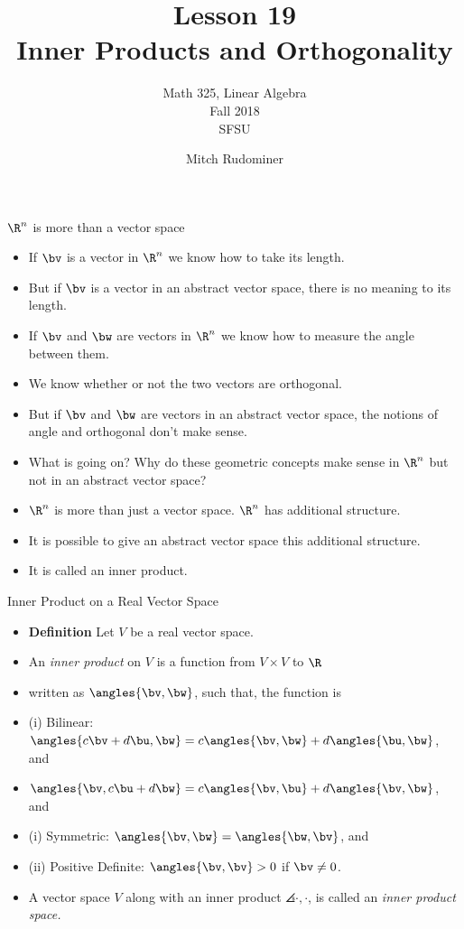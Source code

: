 \documentclass{beamer}
\title{Lesson 19 \\ Inner Products and Orthogonality}
\subtitle{Math 325, Linear Algebra \\ Fall 2018 \\ SFSU}
\author{Mitch Rudominer}
\date{}
\begin{document}
\begin{frame}
  \titlepage
\end{frame}


\begin{frame}{$\R^n$ is more than a vector space}

\begin{itemize}
\item If $\bv$ is a vector in $\R^n$ we know how to take its length.
\item But if $\bv$ is a vector in an abstract vector space, there is no meaning to its length.
\item If $\bv$ and $\bw$ are vectors in $\R^n$ we know how to measure the angle between them.
\item We know whether or not the two vectors are orthogonal.
\item But if $\bv$ and $\bw$ are vectors in an abstract vector space, the notions of angle and orthogonal don't make sense.
\item What is going on? Why do these geometric concepts make sense in $\R^n$ but not in an abstract vector space?
\item $\R^n$ is more than just a vector space. $\R^n$ has additional structure.
\item It is possible to give an abstract vector space this additional structure.
\item It is called an inner product.
\end{itemize}
\end{frame}


\begin{frame}{Inner Product on a Real Vector Space}

\begin{itemize}
\item \textbf{Definition} Let $V$ be a real vector space.
\item An \emph{inner product} on $V$ is a function from $V\times V$ to $\R$
\item written as $\angles{\bv,\bw}$, such that, the function is
\item (i) Bilinear: $\angles{c\bv+d\bu,\bw} = c\angles{\bv,\bw} + d\angles{\bu,\bw}$, and
\item $\angles{\bv,c\bu + d\bw} = c\angles{\bv,\bu} + d\angles{\bv,\bw}$, and
\item (i) Symmetric: $\angles{\bv,\bw}=\angles{\bw,\bv}$, and
\item (ii) Positive Definite: $\angles{\bv,\bv} > 0$ if $\bv\not=0$.
\item A vector space $V$ along with an inner product $\angles{\cdot, \cdot}$, is
called an \emph{inner product space.}
\end{itemize}
\end{frame}
\end{document}

